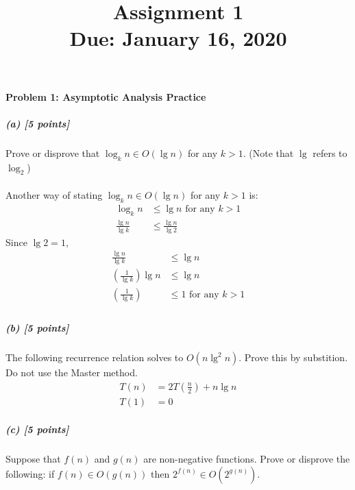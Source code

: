\documentclass[11pt]{article}
\title{\bf Assignment 1 \\[2ex]
\rm\normalsize Due: January 16, 2020}
\date{}
\author{}
\begin{document}
\maketitle

\begin{center}
\end{center}

\paragraph{Problem 1: Asymptotic Analysis Practice}
\subparagraph{(a) [5 points]}
Prove or disprove that $\log_k n \in O(\lg n)$ for any $k > 1$. (Note that $\lg$ refers to $\log_2$)
\\
\\
Another way of stating $\log_k n \in O(\lg n)$ for any $k > 1$ is:
\begin{align*}
\log_k n &\leq \lg n \text{ for any }  k > 1 \\
\frac{\lg n}{\lg k} &\leq \frac{\lg n}{\lg 2}
\end{align*}
Since $\lg 2 = 1$, \\
\begin{align*}
\frac{\lg n}{\lg k} &\leq \lg n \\
\left(\frac{1}{\lg k}\right)\lg n &\leq \lg n \\
\left(\frac{1}{\lg k}\right) &\leq 1 \text{ for any } k > 1 \\
\end{align*}


\subparagraph{(b) [5 points]}
The following recurrence relation solves to $O(n \lg^2 n)$. Prove this by substition. Do not use the Master method.
\begin{align*}
T(n) &= 2T\left( \frac n2 \right) + n \lg n \\
T(1) &= 0
\end{align*}
\subparagraph{(c) [5 points]}
Suppose that $f(n)$ and $g(n)$ are non-negative functions. Prove or disprove the following: if $f(n) \in O(g(n))$ then $2^{f(n)} \in O(2^{g(n)})$.
\end{document}

